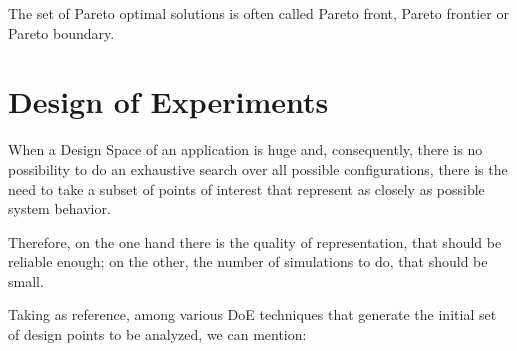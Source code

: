 The set of Pareto optimal solutions is often called Pareto front, Pareto frontier or Pareto boundary.





\section{Design of Experiments}\label{doe}

When a Design Space of an application is huge and, consequently, there is no possibility to do an exhaustive search over all possible configurations, there is the need to take a subset of points of interest that represent as closely as possible system behavior.

Therefore, on the one hand there is the quality of representation, that should be reliable enough; on the other, the number of simulations to do, that should be small.

Taking \cite{natrella2013nist} as reference, among various DoE techniques that generate the initial set of design points to be analyzed, we can mention:

